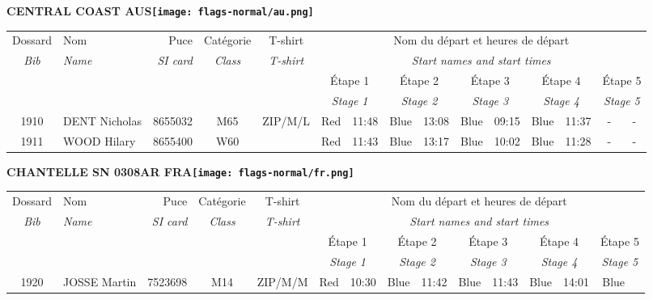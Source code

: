 \documentclass{report}
\begin{document}
\newpage
  \Huge \centering \bfseries CENTRAL COAST  AUS\normalfont \footnotesize \sffamily \hfill \texttt{[image: flags-normal/au.png]} \newline 
  \begin{longtable}{|c|l|r|c|c|*{5}{cc|}}
    Dossard & Nom  & Puce    & Catégorie & T-shirt & \multicolumn{10}{c|}{Nom du départ et heures de départ} \\
    \itshape Bib     & \itshape Name & \itshape SI card & \itshape Class  & \itshape  T-shirt  & \multicolumn{10}{c|}{\itshape Start names and start times} \\
    \hline
    & & & & & \multicolumn{2}{c|}{Étape 1} & \multicolumn{2}{c|}{Étape 2} & \multicolumn{2}{c|}{Étape 3} & \multicolumn{2}{c|}{Étape 4} & \multicolumn{2}{c|}{Étape 5} \\
    & & & & & \multicolumn{2}{c|}{\itshape Stage 1} & \multicolumn{2}{c|}{\itshape Stage 2} & \multicolumn{2}{c|}{\itshape Stage 3} & \multicolumn{2}{c|}{\itshape Stage 4} & \multicolumn{2}{c|}{\itshape Stage 5} \\
    \hline
    1910 & DENT Nicholas & 8655032 & M65 & ZIP/M/L & Red & 11:48 & Blue & 13:08 & Blue & 09:15 & Blue & 11:37 & - &  -\\
    1911 & WOOD Hilary & 8655400 & W60 &   & Red & 11:43 & Blue & 13:17 & Blue & 10:02 & Blue & 11:28 & - &  -\\
  \end{longtable}
\newpage
  \Huge \centering \bfseries CHANTELLE SN 0308AR FRA\normalfont \footnotesize \sffamily \hfill \texttt{[image: flags-normal/fr.png]} \newline 
  \begin{longtable}{|c|l|r|c|c|*{5}{cc|}}
    Dossard & Nom  & Puce    & Catégorie & T-shirt & \multicolumn{10}{c|}{Nom du départ et heures de départ} \\
    \itshape Bib     & \itshape Name & \itshape SI card & \itshape Class  & \itshape  T-shirt  & \multicolumn{10}{c|}{\itshape Start names and start times} \\
    \hline
    & & & & & \multicolumn{2}{c|}{Étape 1} & \multicolumn{2}{c|}{Étape 2} & \multicolumn{2}{c|}{Étape 3} & \multicolumn{2}{c|}{Étape 4} & \multicolumn{2}{c|}{Étape 5} \\
    & & & & & \multicolumn{2}{c|}{\itshape Stage 1} & \multicolumn{2}{c|}{\itshape Stage 2} & \multicolumn{2}{c|}{\itshape Stage 3} & \multicolumn{2}{c|}{\itshape Stage 4} & \multicolumn{2}{c|}{\itshape Stage 5} \\
    \hline
    1920 & JOSSE Martin & 7523698 & M14 & ZIP/M/M & Red & 10:30 & Blue & 11:42 & Blue & 11:43 & Blue & 14:01 & Blue &  \\
  \end{longtable}
\end{document}
